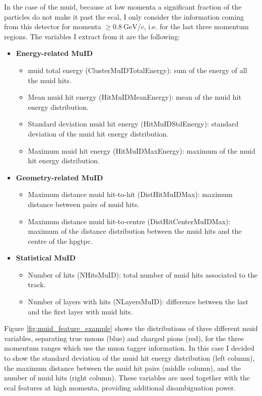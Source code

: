 In the case of the \gls{muid}, because at low momenta a significant fraction of the particles do not make it past the \gls{ecal}, I only consider the information coming from this detector for momenta $\geq 0.8~\mathrm{GeV}/c$, i.e. for the last three momentum regions. The variables I extract from it are the following:
\begin{itemize}
	\item \textbf{Energy-related MuID}
	\begin{itemize}
		\item \gls{muid} total energy (ClusterMuIDTotalEnergy): sum of the energy of all the \gls{muid} hits.
		\item Mean \gls{muid} hit energy (HitMuIDMeanEnergy): mean of the \gls{muid} hit energy distribution.
		\item Standard deviation \gls{muid} hit energy (HitMuIDStdEnergy): standard deviation of the \gls{muid} hit energy distribution.
		\item Maximum \gls{muid} hit energy (HitMuIDMaxEnergy): maximum of the \gls{muid} hit energy distribution.
	\end{itemize}
	\item \textbf{Geometry-related MuID}
	\begin{itemize}
		\item Maximum distance \gls{muid} hit-to-hit (DistHitMuIDMax): maximum distance between pairs of \gls{muid} hits.
		\item Maximum distance \gls{muid} hit-to-centre (DistHitCenterMuIDMax): maximum of the distance distribution between the \gls{muid} hits and the centre of the \gls{hpgtpc}.
	\end{itemize}
	\item \textbf{Statistical MuID}
	\begin{itemize}
		\item Number of hits (NHitsMuID): total number of \gls{muid} hits associated to the track.
		\item Number of layers with hits (NLayersMuID): difference between the last and the first layer with \gls{muid} hits.
	\end{itemize}
\end{itemize}

Figure \ref{fig:muid_feature_example} shows the distributions of three different \gls{muid} variables, separating true muons (blue) and charged pions (red), for the three momentum ranges which use the muon tagger information. In this case I decided to show the standard deviation of the \gls{muid} hit energy distribution (left column), the maximum distance between the \gls{muid} hit pairs (middle column), and the number of \gls{muid} hits (right column). These variables are used together with the \gls{ecal} features at high momenta, providing additional disambiguation power.

